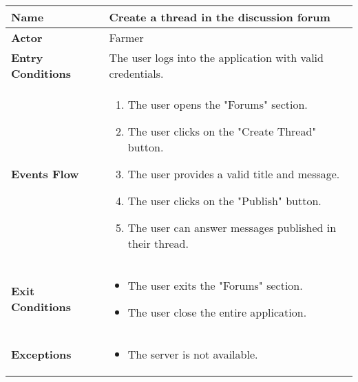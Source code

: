 \begin{center}
\renewcommand{\arraystretch}{1.25}
\begin{tabular}{|l|>{\raggedright\arraybackslash}m{12cm}|}
    \hline
    \textbf{Name} & Create a thread in the discussion forum\\
    \hline
   	\textbf{Actor} & Farmer\\
    \hline
    \textbf{Entry Conditions} & The user logs into the application with valid credentials.\\
    \hline
    \textbf{Events Flow} & 
    		\begin{enumerate}
    			\item The user opens the "Forums" section.
    			\item The user clicks on the "Create Thread" button.
    			\item The user provides a valid title and message.
    			\item The user clicks on the "Publish" button.
    			\item The user can answer messages published in their thread.
    		\end{enumerate}
    	\\
    \hline
    \textbf{Exit Conditions} & \begin{itemize}
    	\item The user exits the "Forums" section.
    	\item The user close the entire application.    
    	\end{itemize}
	\\
    \hline
    \textbf{Exceptions} & 
    		\begin{itemize}
    			\item The server is not available.
    		\end{itemize}
    	\\
    \hline
\end{tabular}
\end{center}